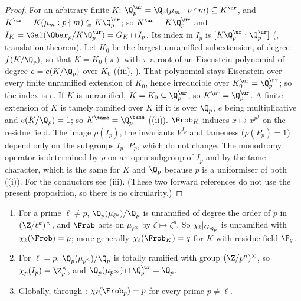 \begin{proof}
For an arbitrary finite $K$: $\Q_p^{\ur}=\Q_p(\mu_m:p\nmid m)\subseteq K^{\ur}$, and $K^{\ur}=K(\mu_m:p\nmid m)\subseteq K\Q_p^{\ur}$; so $K^{\ur}=K\Q_p^{\ur}$ and
$I_K=\Gal(\Qbar_p/K\Q_p^{\ur})=G_K\cap I_p$. Its index in $I_p$ is $[K\Q_p^{\ur}:\Q_p^{\ur}]$ (, translation theorem). Let $K_0$ be the largest
unramified subextension, of degree $f(K/\Q_p)$, so that $K=K_0(\pi)$ with $\pi$ a root of an Eisenstein polynomial of degree $e=e(K/\Q_p)$ over $K_0$
((iii), ). That polynomial stays Eisenstein over every finite unramified extension of
$K_0$, hence irreducible over $K_0^{\ur}=\Q_p^{\ur}$; so the index is $e$. If $K$ is unramified, $K=K_0\subseteq\Q_p^{\ur}$, so $K^{\ur}=\Q_p^{\ur}$. A finite
extension of $K$ is tamely ramified over $K$ iff it is over $\Q_p$, $e$ being multiplicative and $e(K/\Q_p)=1$; so $K^{\tame}=\Q_p^{\tame}$
((ii)). $\Frob_K$ induces $x\mapsto x^{p^f}$ on the residue field. The image $\rho(I_p)$, the invariants $V^{I_p}$ and tameness ($\rho(P_p)=1$) depend
only on the subgroups $I_p$, $P_p$, which do not change. The monodromy operator is determined by $\rho$ on an open subgroup of $I_p$ and by the
tame character, which is the same for $K$ and $\Q_p$ because $p$ is a uniformiser of both ((i)). For the
conductors see (iii). (These two forward references do not use the present proposition, so there is no circularity.)
\end{proof}

\begin{proposition}\label{prop:local:cyclotomic-local}
\begin{enumerate}[label=(\roman*)]
\item For a prime $\ell\ne p$, $\Q_p(\mu_{\ell^k})/\Q_p$ is unramified of degree the order of $p$ in $(\Z/\ell^k)^\times$, and $\Frob$ acts on $\mu_{\ell^\infty}$ by
$\zeta\mapsto\zeta^p$. So $\chi_\ell|_{G_{\Q_p}}$ is unramified with $\chi_\ell(\Frob)=p$; more generally $\chi_\ell(\Frob_K)=q$ for $K$ with residue field $\F_q$.
\item For $\ell=p$, $\Q_p(\mu_{p^n})/\Q_p$ is totally ramified with group $(\Z/p^n)^\times$, so $\chi_p(I_p)=\Z_p^\times$, and
$\Q_p(\mu_{p^\infty})\cap\Q_p^{\ur}=\Q_p$.
\item Globally, through : $\chi_\ell(\Frob_p)=p$ for every prime $p\ne\ell$.
\end{enumerate}
\end{proposition}


